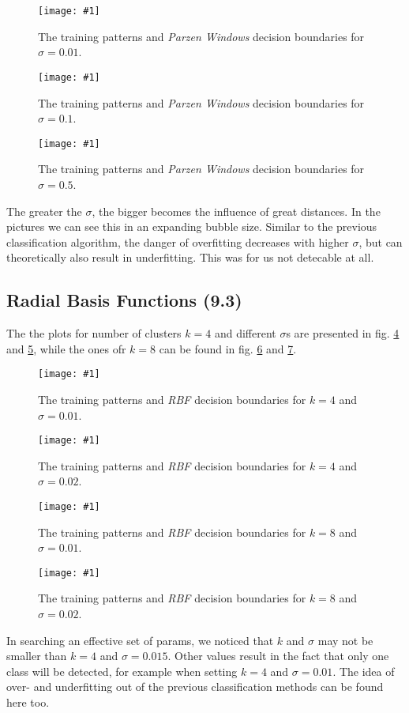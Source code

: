 \documentclass[a4paper,headings=small]{scrartcl}
\newcommand{\image}[3]{
\begin{figure}[htbp]
\centering
\texttt{[image: \#1]}
\caption{#3}
\label{fig:#1}
\end{figure}
}
\begin{document}
\image{out_classifierParzen_sigma2_001}{\classifierPlotWidth}%
	{The training patterns and \emph{Parzen Windows} decision boundaries for $\sigma = 0.01$.}

\image{out_classifierParzen_sigma2_01}{\classifierPlotWidth}%
	{The training patterns and \emph{Parzen Windows} decision boundaries for $\sigma = 0.1$.}

\image{out_classifierParzen_sigma2_05}{\classifierPlotWidth}%
	{The training patterns and \emph{Parzen Windows} decision boundaries for $\sigma = 0.5$.}

The greater the $\sigma$, the bigger becomes the influence of great distances.
In the pictures we can see this in an expanding bubble size.
Similar to the previous classification algorithm, the danger of overfitting decreases with higher $\sigma$,
but can theoretically also result in underfitting.
This was for us not detecable at all.


\subsection{Radial Basis Functions (9.3)}
The the plots for number of clusters $k = 4$ and different $\sigma$s are presented in fig.
\ref{fig:out_classifierRbf_k_4_sigma_001} and
\ref{fig:out_classifierRbf_k_4_sigma_002},
while the ones ofr $k = 8$ can be found in fig.
\ref{fig:out_classifierRbf_k_8_sigma_001} and
\ref{fig:out_classifierRbf_k_8_sigma_002}.

\image{out_classifierRbf_k_4_sigma_001}{\classifierPlotWidth}%
	{The training patterns and \emph{RBF} decision boundaries for $k = 4$ and $\sigma = 0.01$.}

\image{out_classifierRbf_k_4_sigma_002}{\classifierPlotWidth}%
	{The training patterns and \emph{RBF} decision boundaries for $k = 4$ and $\sigma = 0.02$.}

\image{out_classifierRbf_k_8_sigma_001}{\classifierPlotWidth}%
	{The training patterns and \emph{RBF} decision boundaries for $k = 8$ and $\sigma = 0.01$.}

\image{out_classifierRbf_k_8_sigma_002}{\classifierPlotWidth}%
	{The training patterns and \emph{RBF} decision boundaries for $k = 8$ and $\sigma = 0.02$.}

In searching an effective set of params, we noticed that $k$ and $\sigma$ may not be smaller than $k = 4$ and $\sigma = 0.015$.
Other values result in the fact that only one class will be detected,
for example when setting $k = 4$ and $\sigma = 0.01$.
The idea of over- and underfitting out of the previous classification methods can be found here too.
\end{document}
